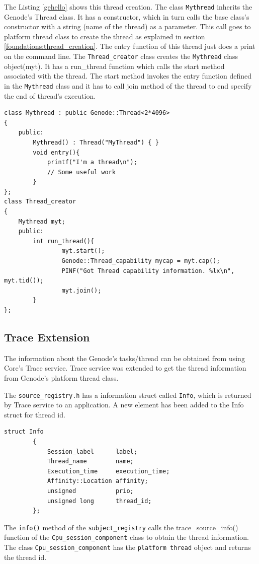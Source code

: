 The Listing \ref{gehello} shows this thread creation. The class \texttt{Mythread} inherits the Genode's Thread class. It has a constructor, which in turn calls the base class's constructor with a string (name of the thread) as a parameter. This call goes to platform thread class to create the thread as explained in section \ref{foundations:thread_creation}. The entry function of this thread just does a print on the  command line. The \texttt{Thread\_creator} class creates the \texttt{Mythread} class object(myt). It has a run\_thread function which calls the start method associated with the thread. The start method invokes the entry function defined in the \texttt{Mythread} class and it has to call join method of the thread to end specify the end of thread's execution.

\begin{lstlisting}[caption={gehello trace utility},label={gehello}, style=customcpp]
class Mythread : public Genode::Thread<2*4096>
{
	public:
		Mythread() : Thread("MyThread") { }
		void entry(){
			printf("I'm a thread\n");
			// Some useful work
		}
};
class Thread_creator
{
	Mythread myt;
	public:
		int run_thread(){
				myt.start();
				Genode::Thread_capability mycap = myt.cap();
				PINF("Got Thread capability information. %lx\n", myt.tid());
				myt.join();
		}
};
\end{lstlisting}

\subsection{Trace Extension}
The information about the Genode's tasks/thread can be obtained from using Core's Trace service. Trace service was extended to get the thread information from Genode's platform thread class. 

The \texttt{source\_registry.h} has a information struct called \texttt{Info}, which is returned by Trace service to an application. A new element has been added to the Info struct for thread id. 


\begin{lstlisting}[style=customcpp]
	struct Info
		{
			Session_label      label;
			Thread_name        name;
			Execution_time     execution_time;
			Affinity::Location affinity;
			unsigned 		   prio;
			unsigned long	   thread_id;
		};
\end{lstlisting}


The \texttt{info()} method of the \texttt{subject\_registry} calls the {trace\_source\_info()} function of the \texttt{Cpu\_session\_component} class to obtain the thread information. The class \texttt{Cpu\_session\_component} has the \texttt{platform thread} object and returns the thread id.

